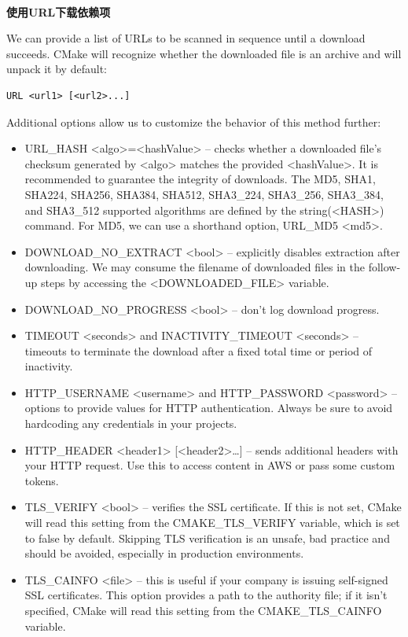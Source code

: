 \hspace*{\fill} \\ %
\noindent
\textbf{使用URL下载依赖项}

We can provide a list of URLs to be scanned in sequence until a download succeeds. CMake will recognize whether the downloaded file is an archive and will unpack it by default:

\begin{lstlisting}[style=styleCMake]
URL <url1> [<url2>...]
\end{lstlisting} 

Additional options allow us to customize the behavior of this method further:

\begin{itemize}
\item 
URL\_HASH <algo>=<hashValue> – checks whether a downloaded file's checksum generated by <algo> matches the provided <hashValue>. It is recommended to guarantee the integrity of downloads. The MD5, SHA1, SHA224, SHA256, SHA384, SHA512, SHA3\_224, SHA3\_256, SHA3\_384, and SHA3\_512 supported algorithms are defined by the string(<HASH>) command. For MD5, we can use a shorthand option, URL\_MD5 <md5>.

\item 
DOWNLOAD\_NO\_EXTRACT <bool> – explicitly disables extraction after downloading. We may consume the filename of downloaded files in the follow-up steps by accessing the <DOWNLOADED\_FILE> variable.

\item 
DOWNLOAD\_NO\_PROGRESS <bool> – don't log download progress.

\item 
TIMEOUT <seconds> and INACTIVITY\_TIMEOUT <seconds> – timeouts to terminate the download after a fixed total time or period of inactivity.

\item 
HTTP\_USERNAME <username> and HTTP\_PASSWORD <password> – options to provide values for HTTP authentication. Always be sure to avoid hardcoding any credentials in your projects.

\item 
HTTP\_HEADER <header1> [<header2>…] – sends additional headers with your HTTP request. Use this to access content in AWS or pass some custom tokens.

\item 
TLS\_VERIFY <bool> – verifies the SSL certificate. If this is not set, CMake will read this setting from the CMAKE\_TLS\_VERIFY variable, which is set to false by default. Skipping TLS verification is an unsafe, bad practice and should be avoided, especially in production environments.

\item 
TLS\_CAINFO <file> – this is useful if your company is issuing self-signed SSL certificates. This option provides a path to the authority file; if it isn't specified, CMake will read this setting from the CMAKE\_TLS\_CAINFO variable.
\end{itemize}

